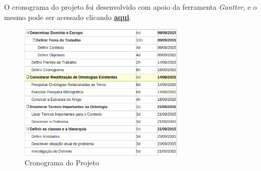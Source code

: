 
	O cronograma do projeto foi desenvolvido com apoio da ferramenta \textit{Gantter}, e o mesmo pode ser acessado clicando \href{https://www.smartapp.com/gantterforgoogledrive/index.html?fileID=0B3yaBD0SgM3dZkpOVExUekp2SVU#}{\textbf{aqui}}. 

	\begin{figure}[H]
		\centering
		\includegraphics[width=0.7\textwidth]{imagens/cronogramaWeb}
		\caption{Cronograma do Projeto}
		\label{img:EAP}
	\end{figure}